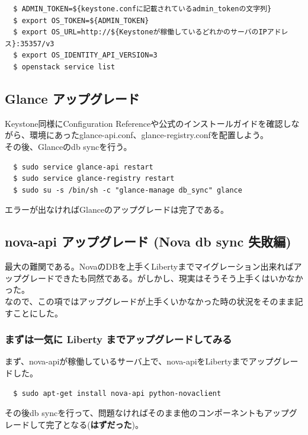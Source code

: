 \documentclass[9pt,b5paper,tombo,openany]{jsbook}
\begin{document}
\begin{lstlisting}
  $ ADMIN_TOKEN=${keystone.confに記載されているadmin_tokenの文字列}
  $ export OS_TOKEN=${ADMIN_TOKEN}
  $ export OS_URL=http://${Keystoneが稼働しているどれかのサーバのIPアドレス}:35357/v3
  $ export OS_IDENTITY_API_VERSION=3
  $ openstack service list
\end{lstlisting}

\subsection{Glance アップグレード}
Keystone同様にConfiguration Referenceや公式のインストールガイドを確認しながら、環境にあったglance-api.conf、glance-registry.confを配置しよう。\\[1ex]

\noindent
その後、Glanceのdb syncを行う。

\begin{lstlisting}
  $ sudo service glance-api restart
  $ sudo service glance-registry restart
  $ sudo su -s /bin/sh -c "glance-manage db_sync" glance
\end{lstlisting}

\noindent
エラーが出なければGlanceのアップグレードは完了である。

\subsection{nova-api アップグレード (Nova db sync 失敗編)}
最大の難関である。NovaのDBを上手くLibertyまでマイグレーション出来ればアップグレードできたも同然である。がしかし、現実はそうそう上手くはいかなかった。\\[1ex]

\noindent
なので、この項ではアップグレードが上手くいかなかった時の状況をそのまま記すことにした。

\subsubsection{まずは一気に Liberty までアップグレードしてみる}
\noindent
まず、nova-apiが稼働しているサーバ上で、nova-apiをLibertyまでアップグレードした。

\begin{lstlisting}
  $ sudo apt-get install nova-api python-novaclient
\end{lstlisting}

その後db syncを行って、問題なければそのまま他のコンポーネントもアップグレードして完了となる(\textbf{はずだった})。\\[1ex]
\end{document}
